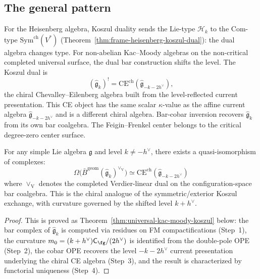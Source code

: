 \subsection{The general pattern}

\begin{theorem}\label{thm:level-shifting-abstract}
For the Heisenberg algebra, Koszul duality sends the Lie-type
$\mathcal{H}_k$ to the Com-type
$\mathrm{Sym}^{\mathrm{ch}}(V^*)$
(Theorem~\ref{thm:frame-heisenberg-koszul-dual}): the dual algebra
changes type.
For non-abelian Kac--Moody algebras on the non-critical completed
universal surface, the dual bar construction shifts the level.  The
Koszul dual is
\[
(\widehat{\mathfrak{g}}_k)^!
= \mathrm{CE}^{\mathrm{ch}}(\widehat{\mathfrak{g}}_{-k-2h^\vee}),
\]
the chiral Chevalley--Eilenberg algebra built from the level-reflected
current presentation.  This CE object has the same scalar
$\kappa$-value as the affine current algebra
$\widehat{\mathfrak{g}}_{-k-2h^\vee}$ and is a different chiral
algebra.  Bar-cobar inversion recovers $\widehat{\mathfrak g}_k$
from its own bar coalgebra.  The Feigin--Frenkel center belongs to the
critical degree-zero center surface.

For any simple Lie algebra $\mathfrak{g}$ and level $k \neq -h^\vee$, there exists a quasi-isomorphism of complexes:
\begin{equation}
\Omega\bigl(\bar{B}^{\mathrm{geom}}(\widehat{\mathfrak{g}}_k)^{\vee_{\mathrm{V}}}\bigr)
\simeq
\mathrm{CE}^{\mathrm{ch}}(\widehat{\mathfrak{g}}_{-k-2h^\vee})
\end{equation}
where $\vee_{\mathrm{V}}$ denotes the completed Verdier-linear dual
on the configuration-space bar coalgebra.  This is the chiral analogue
of the symmetric/exterior Koszul exchange, with curvature governed by
the shifted level $k+h^\vee$.
\end{theorem}

\begin{proof}
This is proved as Theorem~\ref{thm:universal-kac-moody-koszul} below:
the bar complex of $\widehat{\mathfrak{g}}_k$ is computed via residues
on FM compactifications (Step~1), the curvature
$m_0 = (k+h^\vee)\mathsf C_{\fg}/(2h^\vee)$ is identified from the
double-pole OPE (Step~2), the cobar OPE recovers the level
$-k - 2h^\vee$ current presentation underlying the chiral CE algebra
(Step~3), and the result is characterized by functorial uniqueness
(Step~4).
\end{proof}

